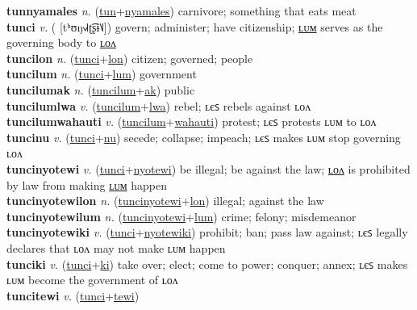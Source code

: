 \textbf{tunnyamales} \textit{n.} (\hyperref[tun]{tun}+\hyperref[nyamales]{nyamales})
carnivore; something that eats meat \label{tunnyamales} \\
\textbf{tunci} \textit{v.} ( [tʰʊŋ˧˩˧ʈ͡ʂɨ˥˩])
govern; administer; have citizenship; \hyperref[tuncilum]{ʟᴜᴍ} serves as the governing body to \hyperref[tuncilon]{ʟᴏᴧ} \label{tunci} \\
\textbf{tuncilon} \textit{n.} (\hyperref[tunci]{tunci}+\hyperref[lon]{lon})
citizen; governed; people \label{tuncilon} \\
\textbf{tuncilum} \textit{n.} (\hyperref[tunci]{tunci}+\hyperref[lum]{lum})
government \label{tuncilum} \\
\textbf{tuncilumak} \textit{n.} (\hyperref[tuncilum]{tuncilum}+\hyperref[ak]{ak})
public \label{tuncilumak} \\
\textbf{tuncilumlwa} \textit{v.} (\hyperref[tuncilum]{tuncilum}+\hyperref[lwa]{lwa})
rebel; ʟєꜱ rebels against ʟᴏᴧ \label{tuncilumlwa} \\
\textbf{tuncilumwahauti} \textit{v.} (\hyperref[tuncilum]{tuncilum}+\hyperref[wahauti]{wahauti})
protest; ʟєꜱ protests ʟᴜᴍ to ʟᴏᴧ \label{tuncilumwahauti} \\
\textbf{tuncinu} \textit{v.} (\hyperref[tunci]{tunci}+\hyperref[nu]{nu})
secede; collapse; impeach; ʟєꜱ makes ʟᴜᴍ stop governing ʟᴏᴧ \label{tuncinu} \\
\textbf{tuncinyotewi} \textit{v.} (\hyperref[tunci]{tunci}+\hyperref[nyotewi]{nyotewi})
be illegal; be against the law; \hyperref[tuncinyotewilon]{ʟᴏᴧ} is prohibited by law from making \hyperref[tuncinyotewilum]{ʟᴜᴍ} happen \label{tuncinyotewi} \\
\textbf{tuncinyotewilon} \textit{n.} (\hyperref[tuncinyotewi]{tuncinyotewi}+\hyperref[lon]{lon})
illegal; against the law \label{tuncinyotewilon} \\
\textbf{tuncinyotewilum} \textit{n.} (\hyperref[tuncinyotewi]{tuncinyotewi}+\hyperref[lum]{lum})
crime; felony; misdemeanor \label{tuncinyotewilum} \\
\textbf{tuncinyotewiki} \textit{v.} (\hyperref[tunci]{tunci}+\hyperref[nyotewiki]{nyotewiki})
prohibit; ban; pass law against; ʟєꜱ legally declares that ʟᴏᴧ may not make ʟᴜᴍ happen \label{tuncinyotewiki} \\
\textbf{tunciki} \textit{v.} (\hyperref[tunci]{tunci}+\hyperref[ki]{ki})
take over; elect; come to power; conquer; annex; ʟєꜱ makes ʟᴜᴍ become the government of ʟᴏᴧ \label{tunciki} \\
\textbf{tuncitewi} \textit{v.} (\hyperref[tunci]{tunci}+\hyperref[tewi]{tewi})
